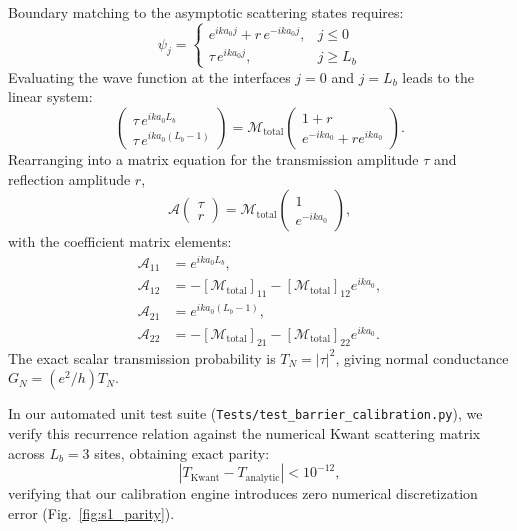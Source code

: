 \documentclass[aps,prb,reprint,superscriptaddress,showpacs,amsmath,amssymb]{revtex4-2}
\begin{document}
Boundary matching to the asymptotic scattering states requires:
\begin{equation}
\psi_j = 
\begin{cases} 
e^{ik a_0 j} + r \, e^{-ik a_0 j}, & j \le 0 \\
\tau \, e^{ik a_0 j}, & j \ge L_b 
\end{cases}
\label{eq:boundary_conditions}
\end{equation}
Evaluating the wave function at the interfaces $j=0$ and $j=L_b$ leads to the linear system:
\begin{equation}
\begin{pmatrix} \tau \, e^{ik a_0 L_b} \\ \tau \, e^{ik a_0 (L_b - 1)} \end{pmatrix} = \mathcal{M}_{\mathrm{total}} \begin{pmatrix} 1 + r \\ e^{-ik a_0} + r e^{ik a_0} \end{pmatrix}.
\label{eq:interface_match}
\end{equation}
Rearranging into a matrix equation for the transmission amplitude $\tau$ and reflection amplitude $r$,
\begin{equation}
\mathcal{A} \begin{pmatrix} \tau \\ r \end{pmatrix} = \mathcal{M}_{\mathrm{total}} \begin{pmatrix} 1 \\ e^{-ik a_0} \end{pmatrix},
\label{eq:transfer_solve}
\end{equation}
with the coefficient matrix elements:
\begin{align}
\mathcal{A}_{11} &= e^{ik a_0 L_b}, \nonumber \\
\mathcal{A}_{12} &= -[\mathcal{M}_{\mathrm{total}}]_{11} - [\mathcal{M}_{\mathrm{total}}]_{12} e^{ik a_0}, \nonumber \\
\mathcal{A}_{21} &= e^{ik a_0 (L_b - 1)}, \nonumber \\
\mathcal{A}_{22} &= -[\mathcal{M}_{\mathrm{total}}]_{21} - [\mathcal{M}_{\mathrm{total}}]_{22} e^{ik a_0}.
\label{eq:matrix_elements}
\end{align}
The exact scalar transmission probability is $T_N = |\tau|^2$, giving normal conductance $G_N = (e^2/h) T_N$.

In our automated unit test suite (\texttt{Tests/test\_barrier\_calibration.py}), we verify this recurrence relation against the numerical Kwant scattering matrix across $L_b = 3$ sites, obtaining exact parity:
\begin{equation}
|T_{\mathrm{Kwant}} - T_{\mathrm{analytic}}| < 10^{-12},
\label{eq:kwant_parity}
\end{equation}
verifying that our calibration engine introduces zero numerical discretization error (Fig.~\ref{fig:s1_parity}).
\end{document}
